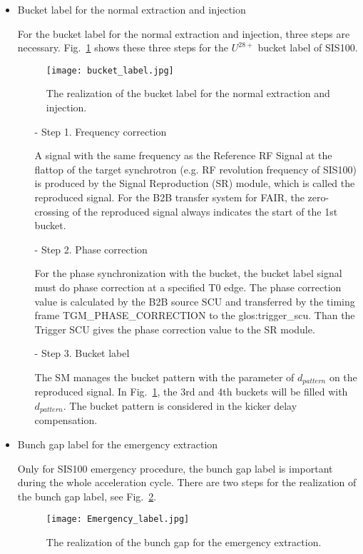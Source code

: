 \begin{itemize}
\item Bucket label for the normal extraction and injection

For the bucket label for the normal extraction and injection, three steps are necessary. Fig.~\ref{bucket_label} shows these three steps for the $U^{28+}$ bucket label of SIS100.
\begin{figure}[!htb]
   \centering   
   \texttt{[image: bucket\_label.jpg]}
   \caption{The realization of the bucket label for the normal extraction and injection.}
   \label{bucket_label}
\end{figure}  
\begin{itemize}
\item[-] Step 1. Frequency correction

A signal with the same frequency as the Reference RF Signal at the flattop of the target synchrotron (e.g. RF revolution frequency of SIS100) is produced by the Signal Reproduction (\gls{SR}) module, which is called the reproduced signal. For the B2B transfer system for FAIR, the zero-crossing of the reproduced signal always indicates the start of the 1st bucket.
\item[-] Step 2. Phase correction

For the phase synchronization with the bucket, the bucket label signal must do phase correction at a specified T0 edge. The phase correction value is calculated by the B2B source SCU and transferred by the timing frame TGM\_PHASE\_CORRECTION to the \gls{glos:trigger_scu}. Than the Trigger SCU gives the phase correction value to the SR module.

\item[-] Step 3. Bucket label

The SM manages the bucket pattern with the parameter of $d_{pattern}$ on the reproduced signal. In Fig.~\ref{bucket_label}, the 3rd and 4th buckets will be filled with $d_{pattern}$. The bucket pattern is considered in the kicker delay compensation. 
\end{itemize}

\item Bunch gap label for the emergency extraction

Only for SIS100 emergency procedure, the bunch gap label is important during the whole acceleration cycle. There are two steps for the realization of the bunch gap label, see Fig.~\ref{Emergency_label}.
\begin{figure}[!htb]
   \centering   
   \texttt{[image: Emergency\_label.jpg]}
   \caption{The realization of the bunch gap for the emergency extraction.}
   \label{Emergency_label}
\end{figure} 


\end{itemize}
